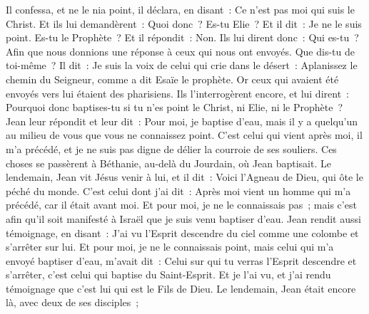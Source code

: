 \begin{multicols}{2}
Il confessa, et ne le nia point, il déclara, en disant~: Ce n'est pas moi qui suis le Christ.
Et ils lui demandèrent~: Quoi donc~? Es-tu Elie~? Et il dit~: Je ne le suis point. Es-tu le Prophète~? Et il répondit~: Non.
Ils lui dirent donc~: Qui es-tu~? Afin que nous donnions une réponse à ceux qui nous ont envoyés. Que dis-tu de toi-même~?
Il dit~: Je suis la voix de celui qui crie dans le désert~: Aplanissez le chemin du Seigneur, comme a dit Esaïe le prophète.
Or ceux qui avaient été envoyés vers lui étaient des pharisiens.
Ils l'interrogèrent encore, et lui dirent~: Pourquoi donc baptises-tu si tu n'es point le Christ, ni Elie, ni le Prophète~?
Jean leur répondit et leur dit~: Pour moi, je baptise d'eau, mais il y a quelqu'un au milieu de vous que vous ne connaissez point.
C'est celui qui vient après moi, il m'a précédé, et je ne suis pas digne de délier la courroie de ses souliers.
Ces choses se passèrent à Béthanie, au-delà du Jourdain, où Jean baptisait.
Le lendemain, Jean vit Jésus venir à lui, et il dit~: Voici l'Agneau de Dieu, qui ôte le péché du monde.
C'est celui dont j'ai dit~: Après moi vient un homme qui m'a précédé, car il était avant moi.
Et pour moi, je ne le connaissais pas~; mais c'est afin qu'il soit manifesté à Israël que je suis venu baptiser d'eau.
Jean rendit aussi témoignage, en disant~: J'ai vu l'Esprit descendre du ciel comme une colombe et s'arrêter sur lui.
Et pour moi, je ne le connaissais point, mais celui qui m'a envoyé baptiser d'eau, m'avait dit~: Celui sur qui tu verras l'Esprit descendre et s'arrêter, c'est celui qui baptise du Saint-Esprit.
Et je l'ai vu, et j'ai rendu témoignage que c'est lui qui est le Fils de Dieu.
Le lendemain, Jean était encore là, avec deux de ses disciples~;

\end{multicols}
